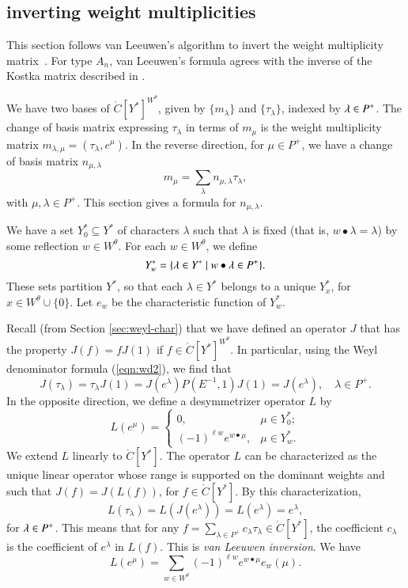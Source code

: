 \subsection{inverting weight multiplicities}

This section follows van Leeuwen's algorithm to invert the weight
multiplicity matrix~\cite{vanleeuwen}.  For type $A_n$, van Leeuwen's
formula agrees with the inverse of the Kostka matrix described in
\cite{duan}.

We have two bases of $\ring{C}[Y^*]^{W^\theta}$, given by
$\{m_\lambda\}$ and $\{\tau_\lambda\}$, indexed by $\lambda\in P^+$.
The change of basis matrix expressing $\tau_\lambda$ in terms of
$m_\mu$ is the weight multiplicity matrix $m_{\lambda,\mu} =
(\tau_\lambda,e^\mu)$.  In the reverse direction, for $\mu\in P^+$, we
have a change of basis matrix $n_{\mu,\lambda}$
\begin{equation}\label{eqn:n}
m_\mu = \sum_{\lambda} n_{\mu,\lambda} \tau_\lambda,
\end{equation}
with $\mu,\lambda\in P^+$.
This section gives a formula for $n_{\mu,\lambda}$.  

We have a set $Y^*_0\subseteq Y^*$ of characters $\lambda$ such that
$\lambda$ is fixed (that is, $w\bullet \lambda = \lambda$) by some
reflection $w\in W^\theta$.  For each $w\in W^\theta$, we define
\begin{equation}
Y^*_w = \{\lambda\in Y^*\mid w\bullet \lambda \in P^+\}.
\end{equation}
These sets partition $Y^*$, so that each $\lambda\in Y^*$ belongs to a
unique $Y^*_x$, for $x\in W^\theta\cup\{0\}$.  Let $e_w$ be the
characteristic function of $Y^*_w$.

Recall (from Section \ref{sec:weyl-char})  that we have defined an operator $J$ that has the property
$J(f) = f J(1)$ if $f\in \ring{C}[Y^*]^{W^\theta}$.  In particular,
using the Weyl denominator formula (\ref{eqn:wd2}), we find that
\begin{equation}
 J(\tau_\lambda) = \tau_\lambda J(1) 
= J(e^\lambda) P(E^{-1},1) J(1) = J(e^\lambda),\quad  \lambda\in P^+.
\end{equation}
In the opposite direction, we define a desymmetrizer operator $L$ by
\[
L(e^\mu) = \begin{cases}
0,& \mu\in Y^*_0;\\
(-1)^{\ell{w}} e^{w\bullet \mu},& \mu\in Y^*_w.
\end{cases}
\]
We extend $L$ linearly to $\ring{C}[Y^*]$.  The operator $L$ can be
characterized as the unique linear operator whose range is supported
on the dominant weights and such that $J(f) = J(L(f))$, for $f\in
\ring{C}[Y^*]$.  By this characterization, 
\[
L(\tau_\lambda) = L(J(e^\lambda)) = L(e^\lambda) =
e^\lambda, 
\]  
for $\lambda\in P^+$.
This means that for any $f =
\sum_{\lambda\in P^+} c_\lambda \tau_\lambda \in \ring{C}[Y^*]$, the
coefficient $c_\lambda$ is the coefficient of $e^\lambda$ in $L(f)$.
This is {\it van Leeuwen inversion}.
We have
\[
L(e^\mu) = \sum_{w\in W^\theta} (-1)^{\ell w} e^{w\bullet \mu} e_w(\mu).
\]

